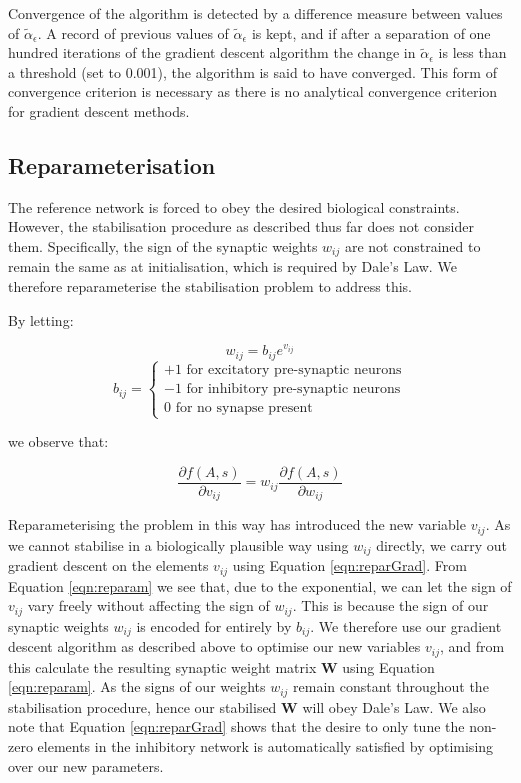 \documentclass[12pt, a4paper]{article}
\begin{document}
Convergence of the algorithm is detected by a difference measure between values of $\tilde{\alpha}_\epsilon$.  A record of previous values of $\tilde{\alpha}_\epsilon$ is kept, and if after a separation of one hundred iterations of the gradient descent algorithm the change in $\tilde{\alpha}_\epsilon$ is less than a threshold (set to 0.001), the algorithm is said to have converged.  This form of convergence criterion is necessary as there is no analytical convergence criterion for gradient descent methods. 


\FloatBarrier
\subsection{Reparameterisation}

The reference network is forced to obey the desired biological constraints. However, the stabilisation procedure as described thus far does not consider them.  Specifically, the sign of the synaptic weights $w_{ij}$ are not constrained to remain the same as at initialisation, which is required by Dale's Law.  We therefore reparameterise the stabilisation problem to address this.

By letting:

    \begin{equation}    w_{ij} = b_{ij} e^{v_{ij}}                          \label{eqn:reparam}  \end{equation}
    \begin{equation}    b_{ij} = \left \{ \substack{+1 \text{ for excitatory pre-synaptic neurons} \\ -1 \text{ for inhibitory pre-synaptic neurons} \\ 0 \text{ for no synapse present}}  \right.                     \end{equation}

\noindent we observe that:

    \begin{equation}    \frac{\partial f(A,s)}{\partial v_{ij}} = w_{ij}\frac{\partial f(A,s)}{\partial w_{ij}}     \label{eqn:reparGrad} \end{equation} 
    
Reparameterising the problem in this way has introduced the new variable $v_{ij}$. As we cannot stabilise in a biologically plausible way using $w_{ij}$ directly, we carry out gradient descent on the elements $v_{ij}$ using Equation \ref{eqn:reparGrad}.  From Equation \ref{eqn:reparam} we see that, due to the exponential, we can let the sign of $v_{ij}$ vary freely without affecting the sign of $w_{ij}$.  This is because the sign of our synaptic weights $w_{ij}$ is encoded for entirely by $b_{ij}$.  We therefore use our gradient descent algorithm as described above to optimise our new variables $v_{ij}$, and from this calculate the resulting synaptic weight matrix $\mathbf{W}$ using Equation \ref{eqn:reparam}.  As the signs of our weights $w_{ij}$ remain constant throughout the stabilisation procedure, hence our stabilised $\mathbf{W}$ will obey Dale's Law.  We also note that Equation \ref{eqn:reparGrad} shows that the desire to only tune the non-zero elements in the inhibitory network is automatically satisfied by optimising over our new parameters. 
\end{document}
